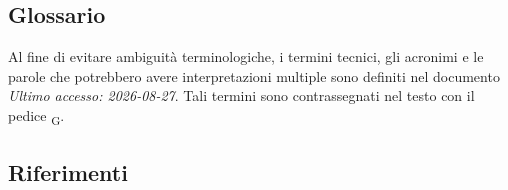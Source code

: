 \subsection{Glossario}
Al fine di evitare ambiguità terminologiche, i termini tecnici, gli acronimi e le parole che potrebbero avere interpretazioni multiple sono definiti nel documento  \\
\textit{Ultimo accesso: 2026-08-27}. Tali termini sono contrassegnati nel testo con il pedice \textsubscript{G}.

\subsection{Riferimenti}

